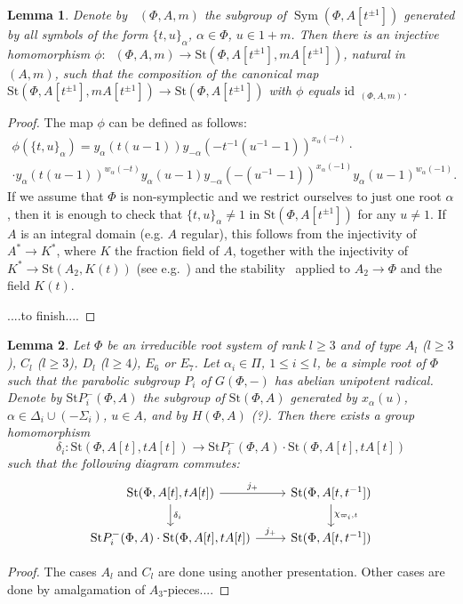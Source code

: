 \documentclass[oneside,12pt]{amsart}
\numberwithin{equation}{section}
\newtheorem{lem}{Lemma}
\numberwithin{lem}{section}
\theoremstyle{definition}
\theoremstyle{remark}
\newcommand{\id}{\mathrm{id}}
\newcommand{\Stb}{\mathrm{St}}
\DeclareMathOperator{\Stsym}{Sym}
\DeclareMathOperator{\Stsymt}{{Sym}^t}
\begin{document}
\begin{lem}\label{lem:tul3.1zh}
Denote by $\Stsymt(\Phi,A,m)$ the subgroup of $\Stsym(\Phi,A[t^{\pm 1}])$ generated by
all symbols of the form $\{t,u\}_\alpha$, $\alpha\in\Phi$, $u\in 1+m$. Then there is an injective
homomorphism $\phi:\Stsymt(\Phi,A,m)\to\Stb(\Phi,A[t^{\pm 1}],mA[t^{\pm 1}])$, natural in $(A,m)$,
such that the composition of the canonical map $\Stb(\Phi,A[t^{\pm 1}],mA[t^{\pm 1}])\to
\Stb(\Phi,A[t^{\pm 1}])$ with $\phi$ equals $\id_{\Stsymt(\Phi,A,m)}$.
\end{lem}
\begin{proof}
The map $\phi$ can be defined as follows:
\begin{multline*}
\phi(\{t,u\}_\alpha)=y_\alpha(t(u-1))y_{-\alpha}(-t^{-1}(u^{-1}-1))^{x_\alpha(-t)}\cdot \\
\cdot y_\alpha(t(u-1))^{w_\alpha(-t)}
y_\alpha(u-1)y_{-\alpha}(-(u^{-1}-1))^{x_\alpha(-1)}y_\alpha(u-1)^{w_\alpha(-1)}.
\end{multline*}
If we assume that $\Phi$ is non-symplectic and we restrict ourselves to just one root $\alpha$,
then it is enough to check that $\{t,u\}_\alpha\neq 1$ in $\Stb(\Phi,A[t^{\pm 1}])$ for any $u\neq 1$.
If $A$ is an integral domain (e.g. $A$ regular), this follows from the injectivity of $A^*\to K^*$, where $K$ the
fraction field of $A$, together with the injectivity of $K^*\to \Stb(A_2,K(t))$ (see e.g.~\cite[Remark 1
on p. 208]{DeSte-dvr}) and the
stability~\cite[Theorem A.2]{DeSte-dvr} applied to $A_2\to\Phi$ and the field $K(t)$.

....to finish....
\end{proof}

\begin{lem}\label{lem:sigma-X}
Let $\Phi$ be an irreducible root system of rank $l\ge 3$ and of type $A_l$ ($l\ge 3$), $C_l$ ($l\ge 3$), $D_l$ ($l\ge 4$),
$E_6$ or $E_7$. Let $\alpha_i\in\Pi$, $1\le i\le l$, be a simple root of $\Phi$ such that the
parabolic subgroup $P_i$ of $G(\Phi,-)$ has abelian unipotent radical. Denote by $\Stb P_i^-(\Phi,A)$
the subgroup of $\Stb(\Phi,A)$ generated by $x_\alpha(u)$, $\alpha\in\Delta_i\cup(-\Sigma_i)$, $u\in A$,
and by $H(\Phi,A)$ (?).
Then there exists a group homomorphism
$$
\delta_i:\Stb(\Phi,A[t],tA[t])\to \Stb P_i^-(\Phi,A)\cdot \Stb(\Phi,A[t],tA[t])
$$
such that the following diagram commutes:
 \[\begin{tikzcd}
\Stb(\Phi,A[t],tA[t]) \arrow[r, "j_+"] \arrow[d, "\delta_i"] & \Stb(\Phi,A[t, t^{-1}])  \ar[d, "\chi_{\varpi_i,t}"] \\
\Stb P_i^-(\Phi,A)\cdot \Stb(\Phi,A[t],tA[t]) \arrow[r, "j_+"] &  \Stb(\Phi,A[t, t^{-1}])
\end{tikzcd}\]
\end{lem}
\begin{proof}
The cases $A_l$ and $C_l$ are done using another presentation. Other cases are done by amalgamation
of $A_3$-pieces....
\end{proof}
\end{document}
